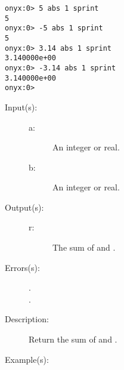 \begin{description}
\begin{description}
\begin{verbatim}
onyx:0> 5 abs 1 sprint
5
onyx:0> -5 abs 1 sprint
5
onyx:0> 3.14 abs 1 sprint
3.140000e+00
onyx:0> -3.14 abs 1 sprint
3.140000e+00
onyx:0>
		\end{verbatim}
	\end{description}
\label{systemdict:add}
\item[{\onyxop{a b}{add}{r}}: ]
	\begin{description}\item[]
	\item[Input(s): ]
		\begin{description}\item[]
		\item[a: ]
			An integer or real.
		\item[b: ]
			An integer or real.
		\end{description}
	\item[Output(s): ]
		\begin{description}\item[]
		\item[r: ]
			The sum of  and .
		\end{description}
	\item[Errors(s): ]
		\begin{description}\item[]
		\item[.]
		\item[.]
		\end{description}
	\item[Description: ]
		Return the sum of  and .
	\item[Example(s): ]\begin{verbatim}


\end{verbatim}
\end{description}
\end{description}

